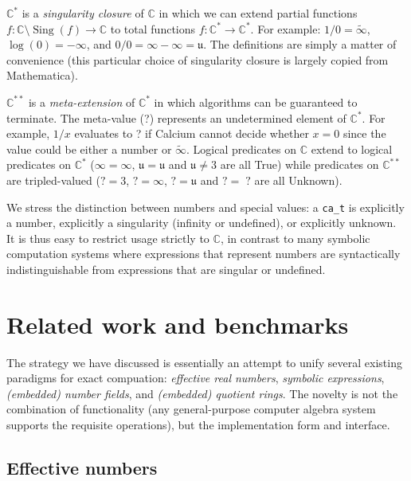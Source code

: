 \documentclass[sigconf,screen,urlbreakonhyphens]{acmart}
\begin{document}
$\mathbb{C}^{*}$ is a \emph{singularity closure} of $\mathbb{C}$ in which
we can extend partial functions $f : \mathbb{C} \setminus \operatorname{Sing}(f) \rightarrow \mathbb{C}$ to
total functions $f : \mathbb{C}^{*} \rightarrow \mathbb{C}^{*}$.
For example: $1 / 0 = \tilde \infty$, $\log(0) = -\infty$, and $0 / 0 = \infty - \infty = \mathfrak{u}$.
The definitions are simply a matter of convenience
(this particular choice of singularity closure is largely copied from Mathematica).

$\mathbb{C}^{**}$ is a \emph{meta-extension} of $\mathbb{C}^{*}$
in which algorithms can be guaranteed to terminate.
The meta-value (?) represents an undetermined element of $\mathbb{C}^{*}$.
For example, $1 / x$ evaluates to ? if Calcium cannot decide whether $x = 0$
since the value could be either a number or $\tilde \infty$.
Logical predicates on $\mathbb{C}$ extend to logical predicates on $\mathbb{C}^{*}$
($\infty = \infty$, $\mathfrak{u} = \mathfrak{u}$ and $\mathfrak{u} \ne 3$ are all True)
while predicates on $\mathbb{C}^{**}$ are tripled-valued
($? = 3$, $? = \infty$, $? = \mathfrak{u}$ and $? =\;?$ are all Unknown).

We stress the distinction between numbers and special values:
a \texttt{ca\_t} is explicitly
a number, explicitly a singularity (infinity or undefined),
or explicitly unknown.
It is thus easy to restrict usage strictly to $\mathbb{C}$,
in contrast to many symbolic
computation systems where expressions that represent numbers
are syntactically indistinguishable from expressions that are
singular or undefined.

\section{Related work and benchmarks}

\label{sect:related}

The strategy we have discussed
is essentially an attempt to unify several existing
paradigms for exact compuation: \emph{effective real numbers},
\emph{symbolic expressions}, \emph{(embedded) number fields},
and \emph{(embedded) quotient rings}. The novelty is not the combination
of functionality (any general-purpose
computer algebra system supports the requisite operations), but the implementation form and interface.

\subsection{Effective numbers}
\end{document}
